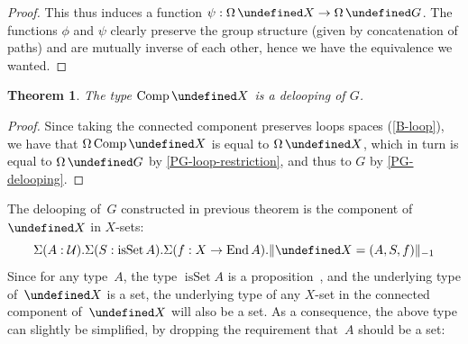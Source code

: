\documentclass[10pt,a4paper]{amsart}
\newtheorem{theorem}{Theorem}
\theoremstyle{definition}
\newcommand{\freegroup}[1]{#1^*} %
\newcommand{\trunc}[2]{\|#2\|_{#1}} %
\newcommand{\ptrunc}[1]{\trunc{-1}{#1}} %
\newcommand{\transport}[1]{#1^\to} %
\newcommand{\End}{\operatorname{End}} %
\newcommand{\Comp}{\operatorname{Comp}} %
\newcommand{\Loop}{\operatorname{\Omega}} %
\let\P\undefined
\newcommand{\P}[1]{\operatorname{P}_{#1}} %
\newcommand{\isSet}{\operatorname{isSet}} %
\newcommand{\U}{\mathcal{U}} %
\begin{document}
\begin{proof}
  This thus induces a function $\psi:\Loop \P X\to\Loop\P G$. The functions
  $\phi$ and $\psi$ clearly preserve the group structure (given by
  concatenation of paths) and are mutually inverse of each other, hence we have the equivalence we wanted.
\end{proof}

\begin{theorem}
  \label{generated-delooping}
  The type $\Comp \P X$ is a delooping of $G$.
\end{theorem}
\begin{proof}
  Since taking the connected component preserves loops spaces (\cref{B-loop}),
  we have that $\Loop\Comp\P X$ is equal to $\Loop\P X$, which in turn is equal
  to $\Loop\P G$ by \cref{PG-loop-restriction}, and thus to $G$ by
  \cref{PG-delooping}.
\end{proof}

The delooping of~$G$ constructed in previous theorem is the component of~$\P X$
in $X$-sets:
\[
  \Sigma(A:\U).\Sigma(S:\isSet A).\Sigma(f:X\to\End A).\ptrunc{\P X=(A,S,f)}
\]
Since for any type~$A$, the type $\isSet A$ is a
proposition~\cite[Theorem~7.1.10]{hottbook}, and the underlying type of~$\P X$
is a set, the underlying type of any $X$-set in the connected component
of~$\P X$ will also be a set. As a consequence, the above type can slightly be
simplified, by dropping the requirement that~$A$ should be a set:
\end{document}
